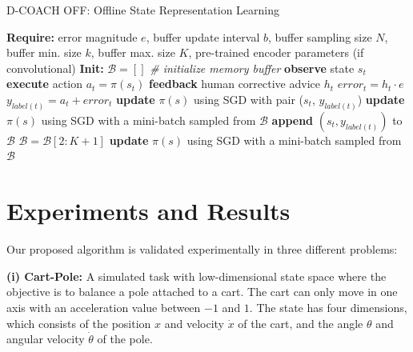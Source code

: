 \begin{algorithm}[h]
\caption{D-COACH OFF: Offline State Representation Learning}\label{algorithm:DeepCOACH}
\begin{algorithmic}[1]
\State \textbf{Require:} error magnitude $e$, buffer update interval $b$, buffer sampling size $N$, buffer min. size $k$, buffer max. size $K$, pre-trained encoder parameters (if convolutional) 
\State \textbf{Init:} $\mathcal{B} = []$  \emph{\# initialize memory buffer}
\State \textbf{observe} state $s_{t}$
\State \textbf{execute} action $a_{t}=\pi(s_{t})$
\State \textbf{feedback} human corrective advice $h_{t}$
\State $\mathit{error}_{t} = h_{t}\cdot e$
\State $y_{label(t)} = a_{t} + \mathit{error}_{t}$ 
\State \textbf{update} $\pi(s)$ using SGD with pair ($s_{t}$, $y_{\mathit{label}(t)}$) 
\State \textbf{update} $\pi(s)$ using SGD with a mini-batch sampled from $\mathcal{B}$
\State \textbf{append} $(s_{t}, y_{\mathit{label}(t)})$ to $\mathcal{B}$
\State $\mathcal{B} = \mathcal{B}[2:K+1]$
\EndIf
\EndIf
{}
\State \textbf{update} $\pi(s)$ using SGD with a mini-batch sampled from $\mathcal{B}$
\EndIf
\EndFor
\end{algorithmic}
\end{algorithm}

\section{Experiments and Results}

Our proposed algorithm is validated experimentally in three different problems: 

\textbf{(i) Cart-Pole:} A simulated task with low-dimensional state space where the objective is to balance a pole attached to a cart. The cart can only move in one axis with an acceleration value between $-1$ and $1$. The state has four dimensions, which consists of the position $x$ and velocity $\dot x$ of the cart, and the angle $\theta$ and angular velocity $\dot \theta$ of the pole.

